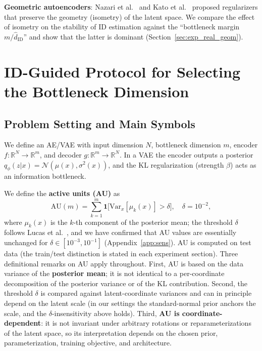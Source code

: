 \documentclass[make,article,submit,pdftex,moreauthors]{Definitions/mdpi}
\newcommand{\hatdID}{\hat{d}_{\mathrm{ID}}}
\newcommand{\R}{\mathbb{R}}
\begin{document}
\textbf{Geometric autoencoders}:
Nazari et al.~\cite{nazari2023geometric} and Kato et
al.~\cite{kato2020rdae} proposed regularizers that preserve the geometry
(isometry) of the latent space.
We compare the effect of isometry on the stability of ID estimation against
the ``bottleneck margin $m / \hatdID$'' and show that the latter is dominant
(Section~\ref{sec:exp_real_geom}).

\section{ID-Guided Protocol for Selecting the Bottleneck Dimension}\label{sec:protocol}

\subsection{Problem Setting and Main Symbols}\label{sec:protocol_setup}

We define an AE/VAE with input dimension $N$, bottleneck dimension $m$,
encoder $f: \R^N \to \R^m$, and decoder $g: \R^m \to \R^N$.
In a VAE the encoder outputs a posterior
$q_\phi(z|x) = \mathcal{N}(\mu(x), \sigma^2(x))$, and the KL regularization
(strength $\beta$) acts as an information bottleneck.

We define the \textbf{active units (AU)} as
\begin{equation}
  \mathrm{AU}(m) = \sum_{k=1}^{m} \mathbf{1}\bigl[\mathrm{Var}_x[\mu_k(x)] > \delta\bigr],
  \quad \delta = 10^{-2},
  \label{eq:au_def}
\end{equation}
where $\mu_k(x)$ is the $k$-th component of the posterior mean; the
threshold $\delta$ follows Lucas et al.~\cite{lucas2019elbo}, and we have
confirmed that AU values are essentially unchanged for
$\delta \in [10^{-3}, 10^{-1}]$ (Appendix~\ref{app:sens}).
AU is computed on test data (the train/test distinction is stated in each
experiment section).
Three definitional remarks on AU apply throughout.
First, AU is based on the data variance of the \textbf{posterior mean};
it is not identical to a per-coordinate decomposition of the posterior
variance or of the KL contribution.
Second, the threshold $\delta$ is compared against latent-coordinate
variances and can in principle depend on the latent scale (in our settings
the standard-normal prior anchors the scale, and the
$\delta$-insensitivity above holds).
Third, \textbf{AU is coordinate-dependent}: it is not invariant under
arbitrary rotations or reparameterizations of the latent space, so its
interpretation depends on the chosen prior, parameterization, training
objective, and architecture.
\end{document}
